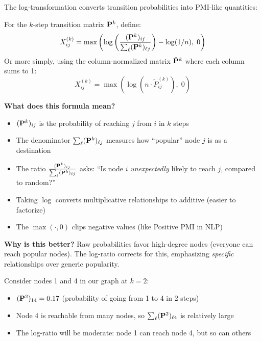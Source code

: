 \begin{notechapter}
The log-transformation converts transition probabilities into PMI-like quantities:

\begin{definition}
For the $k$-step transition matrix $\mathbf{P}^k$, define:
\[
X^{(k)}_{ij} = \max\left( \log\left( \frac{(\mathbf{P}^k)_{ij}}{\sum_{\ell} (\mathbf{P}^k)_{\ell j}} \right) - \log(1/n), \; 0 \right)
\]
Or more simply, using the column-normalized matrix $\tilde{\mathbf{P}}^k$ where each column sums to 1:
\[
X^{(k)}_{ij} = \max\left( \log(n \cdot \tilde{P}^{(k)}_{ij}), \; 0 \right)
\]
\end{definition}

\begin{intuition}
\textbf{What does this formula mean?}

\begin{itemize}
    \item $(\mathbf{P}^k)_{ij}$ is the probability of reaching $j$ from $i$ in $k$ steps
    \item The denominator $\sum_{\ell} (\mathbf{P}^k)_{\ell j}$ measures how ``popular'' node $j$ is as a destination
    \item The ratio $\frac{(\mathbf{P}^k)_{ij}}{\sum_{\ell} (\mathbf{P}^k)_{\ell j}}$ asks: ``Is node $i$ \emph{unexpectedly} likely to reach $j$, compared to random?''
    \item Taking $\log$ converts multiplicative relationships to additive (easier to factorize)
    \item The $\max(\cdot, 0)$ clips negative values (like Positive PMI in NLP)
\end{itemize}

\textbf{Why is this better?} Raw probabilities favor high-degree nodes (everyone can reach popular nodes). The log-ratio corrects for this, emphasizing \emph{specific} relationships over generic popularity.
\end{intuition}

\begin{example}
Consider nodes 1 and 4 in our graph at $k=2$:
\begin{itemize}
    \item $(\mathbf{P}^2)_{14} = 0.17$ (probability of going from 1 to 4 in 2 steps)
    \item Node 4 is reachable from many nodes, so $\sum_{\ell} (\mathbf{P}^2)_{\ell 4}$ is relatively large
    \item The log-ratio will be moderate: node 1 can reach node 4, but so can others
\end{itemize}


\end{example}
\end{notechapter}
